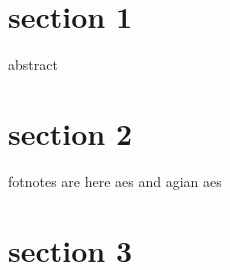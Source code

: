 
\section{section 1}
abstract

\section{section 2}

fotnotes are here
aes and agian aes

\section{section 3}